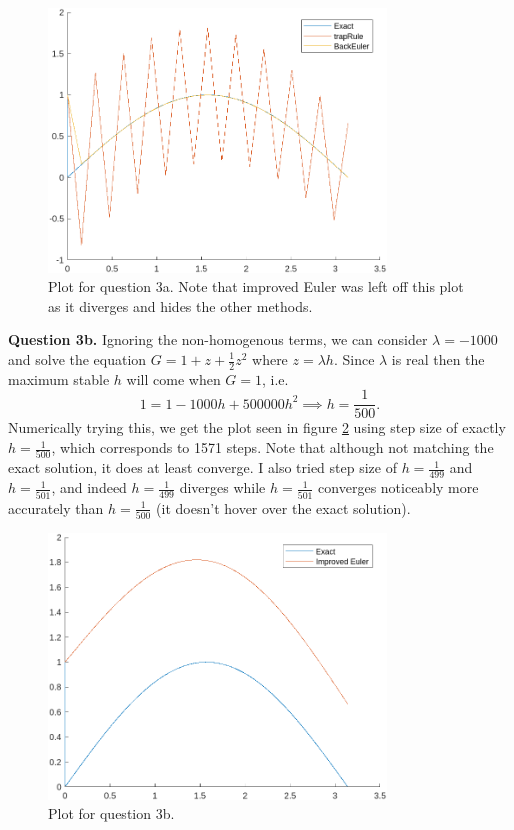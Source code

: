 \documentclass[letterpaper, reqno,11pt]{article}
\begin{document}
\begin{figure}[htpb]
    \centering
    \includegraphics[width=0.8\textwidth]{q3a}
    \caption{Plot for question 3a. Note that improved Euler was left off this plot as it diverges and hides the other methods.}
    \label{fig:q3a}
\end{figure}

{\medskip\noindent\bf Question 3b.} Ignoring the non-homogenous terms, we can consider $\lambda=-1000$ and solve the equation $G=1+z+\frac{1}{2}z^2$ where $z=\lambda h$. Since $\lambda$ is real then the maximum stable $h$ will come when $G=1$, i.e.
\[
1=1-1000h+500000h^2\implies h=\frac{1}{500}
.\]
Numerically trying this, we get the plot seen in figure \ref{fig:q3b} using step size of exactly $h=\frac{1}{500}$, which corresponds to 1571 steps. Note that although not matching the exact solution, it does at least converge. I also tried step size of $h=\frac{1}{499}$ and $h=\frac{1}{501}$, and indeed $h=\frac{1}{499}$ diverges while $h=\frac{1}{501}$ converges noticeably more accurately than $h=\frac{1}{500}$ (it doesn't hover over the exact solution).

\begin{figure}[htpb]
    \centering
    \includegraphics[width=0.8\textwidth]{q3b}
    \caption{Plot for question 3b.}
    \label{fig:q3b}
\end{figure}
\end{document}
